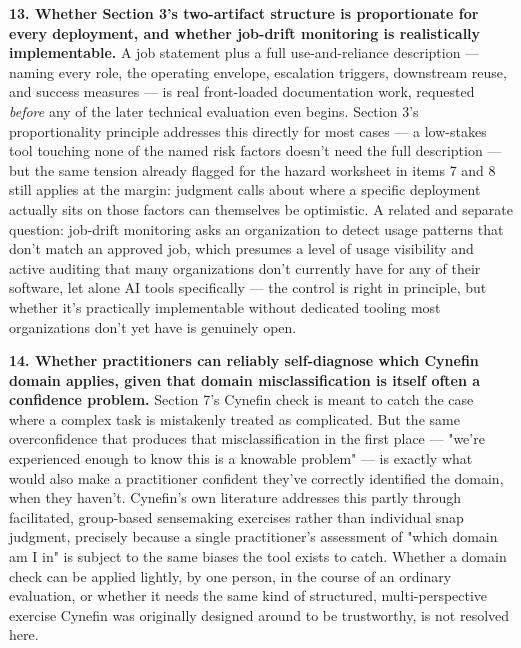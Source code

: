 \textbf{13. Whether Section 3's two-artifact structure is proportionate for every deployment, and whether job-drift monitoring is realistically implementable.} A job statement plus a full use-and-reliance description --- naming every role, the operating envelope, escalation triggers, downstream reuse, and success measures --- is real front-loaded documentation work, requested \emph{before} any of the later technical evaluation even begins. Section 3's proportionality principle addresses this directly for most cases --- a low-stakes tool touching none of the named risk factors doesn't need the full description --- but the same tension already flagged for the hazard worksheet in items 7 and 8 still applies at the margin: judgment calls about where a specific deployment actually sits on those factors can themselves be optimistic. A related and separate question: job-drift monitoring asks an organization to detect usage patterns that don't match an approved job, which presumes a level of usage visibility and active auditing that many organizations don't currently have for any of their software, let alone AI tools specifically --- the control is right in principle, but whether it's practically implementable without dedicated tooling most organizations don't yet have is genuinely open.

\textbf{14. Whether practitioners can reliably self-diagnose which Cynefin domain applies, given that domain misclassification is itself often a confidence problem.} Section 7's Cynefin check is meant to catch the case where a complex task is mistakenly treated as complicated. But the same overconfidence that produces that misclassification in the first place --- "we're experienced enough to know this is a knowable problem" --- is exactly what would also make a practitioner confident they've correctly identified the domain, when they haven't. Cynefin's own literature addresses this partly through facilitated, group-based sensemaking exercises rather than individual snap judgment, precisely because a single practitioner's assessment of "which domain am I in" is subject to the same biases the tool exists to catch. Whether a domain check can be applied lightly, by one person, in the course of an ordinary evaluation, or whether it needs the same kind of structured, multi-perspective exercise Cynefin was originally designed around to be trustworthy, is not resolved here.
